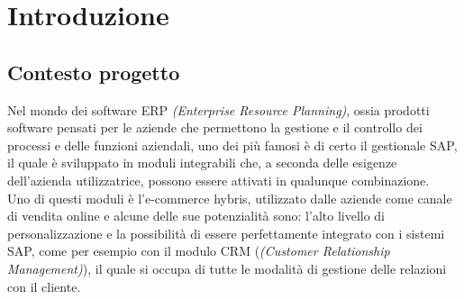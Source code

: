 
\chapter{Introduzione}
\section{Contesto progetto}
Nel mondo dei software ERP \textit{(Enterprise Resource Planning)}, ossia prodotti software pensati per le aziende che permettono la gestione e il controllo dei processi e delle funzioni aziendali, uno dei più famosi è di certo il gestionale SAP, il quale è sviluppato in moduli integrabili che, a seconda delle esigenze dell'azienda utilizzatrice, possono essere attivati in qualunque combinazione.\\
Uno di questi moduli è l'e-commerce hybris, utilizzato dalle aziende come canale di vendita online e alcune delle sue potenzialità sono: l'alto livello di personalizzazione e la possibilità di essere perfettamente integrato con i sistemi SAP, come per esempio con il modulo CRM (\textit{(Customer Relationship Management)}), il quale si occupa di tutte le modalità di gestione delle relazioni con il cliente.


